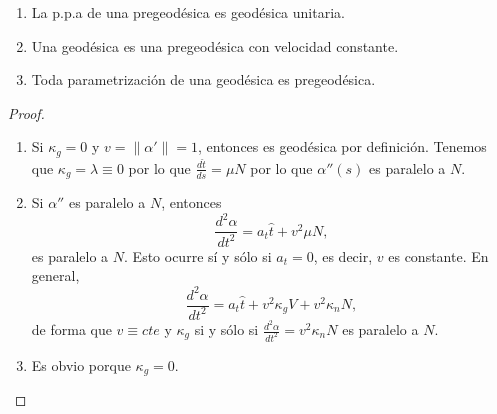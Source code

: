 \begin{prop}
\begin{enumerate}
\item La p.p.a de una pregeodésica es geodésica unitaria. 
\item Una geodésica es una pregeodésica con velocidad constante. 
\item Toda parametrización de una geodésica es pregeodésica.
\end{enumerate} 
\end{prop}
\begin{proof}
\begin{enumerate}
\item Si $\displaystyle \kappa_{g}=0 $ y $\displaystyle v = \|\alpha'\| =1 $, entonces es geodésica por definición. Tenemos que $\displaystyle \kappa_{g}=\lambda \equiv 0 $ por lo que $\displaystyle \frac{d \hat{t}}{d s}= \mu N  $ por lo que $\displaystyle \alpha''\left(s\right) $ es paralelo a $\displaystyle N $. 
\item Si $\displaystyle \alpha'' $ es paralelo a $\displaystyle N $, entonces 
	\[\frac{d^{2}\alpha }{dt ^{2}}=a_{t}\hat{t}+v^{2}\mu N ,\]
	es paralelo a $\displaystyle N $. Esto ocurre sí y sólo si $\displaystyle a_{t}=0 $, es decir, $\displaystyle v  $ es constante. En general, 
	\[\frac{d^{2}\alpha }{dt ^{2}}=a_{t}\hat{t}+v^{2}\kappa_{g}V + v^{2}\kappa_{n}N ,\]
	de forma que $\displaystyle v \equiv cte $ y $\displaystyle \kappa_{g} $ si y sólo si $\displaystyle \frac{d^{2}\alpha }{dt ^{2}} = v^{2}\kappa_{n}N $ es paralelo a $\displaystyle N $.
\item Es obvio porque $\displaystyle \kappa_{g}=0 $.
\end{enumerate}
\end{proof}
